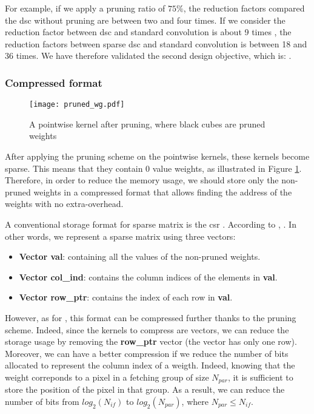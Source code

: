 For example, if we apply a pruning ratio of $75\%$, the reduction factors compared the \acrshort{dsc} without pruning are between two and four times. If we consider the reduction factor between \acrshort{dsc} and standard convolution is about 9 times \cite{zhang_channel_2019}, the reduction factors between sparse \acrshort{dsc} and standard convolution is between 18 and 36 times. We have therefore validated the second design objective, which is: \textbf{}.
%
\subsubsection{Compressed format}
%
\begin{figure}
    \centering
    \texttt{[image: pruned\_wg.pdf]}
    \caption{A pointwise kernel after pruning, where black cubes are pruned weights}
    \label{fig:pruned_wg}
\end{figure}
%
After applying the pruning scheme on the pointwise kernels, these kernels become sparse. This means that they contain 0 value weights, as illustrated in Figure \ref{fig:pruned_wg}. Therefore, in order to reduce the memory usage, we should store only the non-pruned weights in a compressed format that allows finding the address of the weights with no extra-overhead.

A conventional storage format for sparse matrix is the \acrfull{csr} \cite{buluc_parallel_2009}. According to \textcite{buluc_parallel_2009}, . In other words, we represent a sparse matrix using three vectors:
%
\begin{itemize}
    \item \textbf{Vector val}: containing all the values of the non-pruned weights.
    \item \textbf{Vector col\_ind}: contains the column indices of the elements in \textbf{val}.
    \item \textbf{Vector row\_ptr}: contains the index of each row in \textbf{val}.
\end{itemize}
%
However, as for \cite{zhu_efficient_2020}, this format can be compressed further thanks to the pruning scheme. Indeed, since the kernels to compress are vectors, we can reduce the storage usage by removing the \textbf{row\_ptr} vector (the vector has only one row). Moreover, we can have a better compression if we reduce the number of bits allocated to represent the column index of a weigth. Indeed, knowing that the weight correponds to a pixel in a fetching group of size $N_{par}$, it is sufficient to store the position of the pixel in that group. As a result, we can reduce the number of bits from $log_2(N_{if})$ to $log_2(N_{par})$, where $N_{par} \leq N_{if}$.

